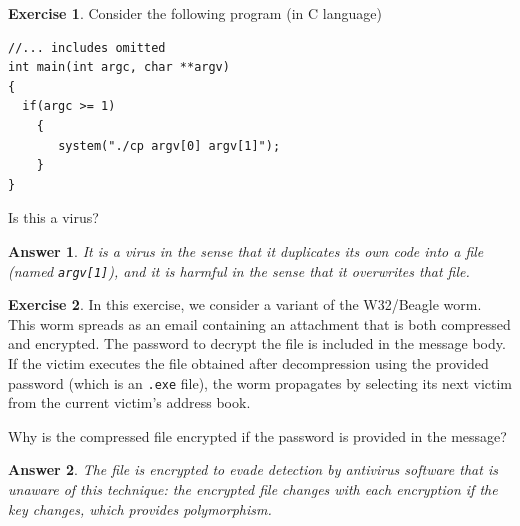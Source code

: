 \documentclass[a4paper,11pt]{article}
\theoremstyle{plain}
\newtheorem{correction}{Answer}
\theoremstyle{definition}
\newtheorem{exercice}{Exercise}
\begin{document}
\begin{exercice}
Consider the following program (in C language)
\begin{verbatim}
//... includes omitted
int main(int argc, char **argv)
{
  if(argc >= 1)
    {
       system("./cp argv[0] argv[1]");
    }
}
\end{verbatim}
Is this a virus?
\end{exercice}

\begin{correction}
It is a virus in the sense that it duplicates its own code into a file (named \texttt{argv[1]}), and it is harmful in the sense that it overwrites that file.
\end{correction}


\begin{exercice}
In this exercise, we consider a variant of the W32/Beagle worm. This worm spreads as an email containing an attachment that is both compressed and encrypted. The password to decrypt the file is included in the message body. If the victim executes the file obtained after decompression using the provided password (which is an \texttt{.exe} file), the worm propagates by selecting its next victim from the current victim's address book.

Why is the compressed file encrypted if the password is provided in the message?

\end{exercice}

\begin{correction}
The file is encrypted to evade detection by antivirus software that is unaware of this technique: the encrypted file changes with each encryption if the key changes, which provides polymorphism.
\end{correction}


\end{document}
